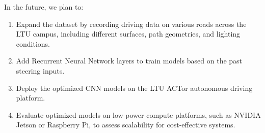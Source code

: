 \documentclass[conference]{IEEEtran}
\begin{document}
In the future, we plan to:
\begin{enumerate}
    \item Expand the dataset by recording driving data on various roads across the LTU campus, including different surfaces, path geometries, and lighting conditions.
    \item Add Recurrent Neural Network layers to train models based on the past steering inputs.
    \item Deploy the optimized CNN models on the LTU ACTor autonomous driving platform.
    \item Evaluate optimized models on low-power compute platforms, such as NVIDIA Jetson or Raspberry Pi, to assess scalability for cost-effective systems.
\end{enumerate}

\clearpage
\end{document}
